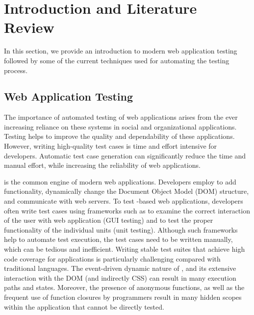 \chapter{Introduction and Literature Review} \label{chap:intro}
In this section, we provide an introduction to modern web application testing followed by some of the current techniques used for automating the testing process.
 
\section{Web Application Testing} \label{Sec:web-testing}
The importance of automated testing of web applications arises from the ever increasing
reliance on these systems in social and organizational
applications. Testing helps to improve the quality and dependability of these applications. However, writing high-quality test cases is time and effort intensive for developers.
Automatic test case generation can significantly reduce the time and manual effort, while
increasing the reliability of web applications.

\javascript is the common engine of modern web applications. 
Developers employ \javascript to add functionality, dynamically change the Document Object Model (DOM) structure,
and communicate with web servers.
To test \javascript-based web applications, developers
often write test cases using frameworks such as \selenium to examine the correct interaction of the user with web application (GUI testing) and \qunit to test the proper functionality of the individual units (unit testing).
Although such frameworks help to automate test execution, the
test cases need to be written manually, which can be tedious
and inefficient. Writing stable test suites that achieve high code coverage for \javascript applications is particularly challenging compared with traditional languages.
The event-driven dynamic nature of \javascript, and its extensive interaction with the DOM (and indirectly CSS) can result in many execution paths and states.
Moreover, the presence of anonymous functions, as well as the frequent use of function closures by \javascript programmers result in many hidden scopes within the application that
cannot be directly tested.

